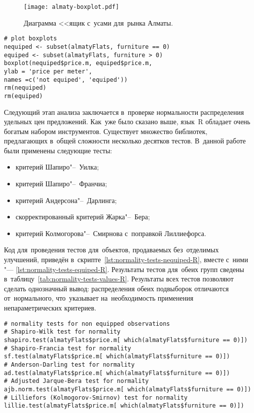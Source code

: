 \documentclass[]{scrartcl}
\begin{document}
%
\begin{figure}[ht]
	\centering
	\texttt{[image: almaty-boxplot.pdf]}
	\caption{Диаграмма <<ящик с~усами для~рынка Алматы.}
	\label{fig:almaty-boxplot-r}
\end{figure}
%
\begin{lstlisting}[float, caption = Построение диграммы <<ящик с~усами>> для~рынка Алматы, firstnumber=1, label= lst:boxplot-R]
# plot boxplots
nequiped <- subset(almatyFlats, furniture == 0)
equiped <- subset(almatyFlats, furniture > 0)
boxplot(nequiped$price.m, equiped$price.m,
ylab = 'price per meter',
names =c('not equiped', 'equiped'))
rm(nequiped)
rm(equiped)
\end{lstlisting}
%

Следующий этап анализа заключается в~проверке нормальности распределения удельных цен предложений. Как~уже было сказано выше, язык~R обладает очень богатым набором инструментов. Существует множество библиотек, предлагающих в~общей сложности несколько десятков тестов. В~данной работе были применены следующие тесты:
\begin{itemize}
	\item критерий Шапиро"--~Уилка;
	\item критерий Шапиро"--~Франчиа;
	\item критерий Андерсона"--~Дарлинга;
	\item скорректированный критерий Жарка"--~Бера;
	\item критерий Колмогорова"--~Смирнова с~поправкой Лиллиефорса.
\end{itemize}
Код для~проведения тестов для~объектов, продаваемых без~отделимых улучшений, приведён в~скрипте~\ref{lst:normality-tests-nequiped-R}, вместе с~ними "--- \ref{lst:normality-tests-equiped-R}.
Результаты тестов для~обеих групп сведены в~таблицу~\ref{tab:normality-tests-values-R}. Результаты всех тестов позволяют сделать однозначный вывод: распределения обеих подвыборок отличаются от~нормального, что~указывает на~необходимость применения непараметрических критериев.
%
\begin{lstlisting}[float, caption = Проведение тестов на~нормальность для~наблюдений без~отделимых улучшений, firstnumber=1, label= lst:normality-tests-nequiped-R]
# normality tests for non equipped observations
# Shapiro-Wilk test for normality
shapiro.test(almatyFlats$price.m[ which(almatyFlats$furniture == 0)])
# Shapiro-Francia test for normality
sf.test(almatyFlats$price.m[ which(almatyFlats$furniture == 0)])
# Anderson-Darling test for normality
ad.test(almatyFlats$price.m[ which(almatyFlats$furniture == 0)])
# Adjusted Jarque-Bera test for normality
ajb.norm.test(almatyFlats$price.m[ which(almatyFlats$furniture == 0)])
# Lilliefors (Kolmogorov-Smirnov) test for normality
lillie.test(almatyFlats$price.m[ which(almatyFlats$furniture == 0)])
\end{lstlisting}
\end{document}
